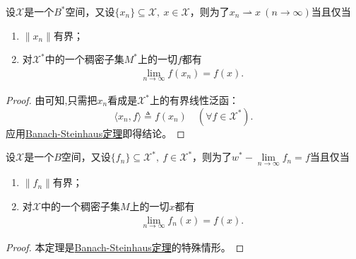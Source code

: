 \documentclass[../../main.tex]{subfiles}%
\begin{document}
\begin{theorem}
设$\mathscr{X}$是一个$B^*$空间，又设$\{x_n\}\subseteq\mathscr{X},\ x\in\mathscr{X}$，则为了$x_n\rightharpoonup x\ (n\to\infty)$当且仅当
\begin{enumerate}[(1)]
\item $\|x_n\|$有界；
\item 对$\mathscr{X}^*$中的一个稠密子集$M^*$上的一切$f$都有
\begin{align*}
\lim\limits_{n\to\infty}f(x_n)=f(x).
\end{align*}
\end{enumerate}
\end{theorem}
\begin{proof}

由可知,只需把$x_n$看成是$\mathscr{X}^*$上的有界线性泛函：
$$\langle x_n,f\rangle\triangleq f(x_n)\quad(\forall f\in\mathscr{X}^*).$$
应用\hyperref[theorem:泛函分析--Banach-Steinhaus定理]{Banach-Steinhaus定理}即得结论。
\end{proof}

\begin{theorem}\label{theorem:泛函分析--定理2.5.21}
设$\mathscr{X}$是一个$B$空间，又设$\{f_n\}\subseteq\mathscr{X}^*,\ f\in\mathscr{X}^*$，则为了$w^*-\lim\limits_{n\to\infty}f_n=f$当且仅当
\begin{enumerate}[(1)]
\item $\|f_n\|$有界；
\item 对$\mathscr{X}$中的一个稠密子集$M$上的一切$x$都有
\begin{align*}
\lim\limits_{n\to\infty}f_n(x)=f(x).
\end{align*}
\end{enumerate}
\end{theorem}
\begin{proof}

本定理是\hyperref[theorem:泛函分析--Banach-Steinhaus定理]{Banach-Steinhaus定理}的特殊情形。

\end{proof}
\end{document}
